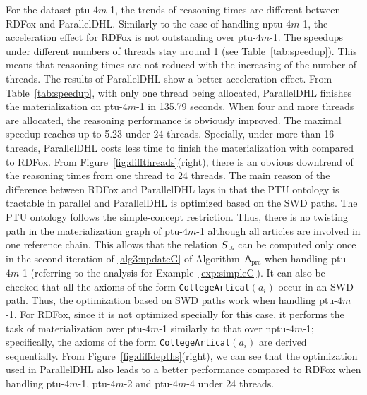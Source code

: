 For the dataset ptu-$4m$-1, the trends of reasoning times are different
between RDFox and ParallelDHL.
Similarly to the case of handling nptu-$4m$-1,
the acceleration effect for RDFox is not outstanding
over ptu-$4m$-1. The speedups under different numbers of threads stay around 1 (see Table~\ref{tab:speedup}).
This means that reasoning times are not reduced with the increasing of the number of threads.
The results of ParallelDHL show a better acceleration effect.
From Table~\ref{tab:speedup}, with only one thread being allocated, ParallelDHL finishes
the materialization on ptu-$4m$-1 in 135.79 seconds. When four and more threads
are allocated, the reasoning performance is obviously improved.
The maximal speedup reaches up to 5.23 under 24 threads.
Specially, under more than 16 threads, ParallelDHL
costs less time to finish the materialization with compared to RDFox.
From Figure~\ref{fig:diffthreads}(right), there is an obvious downtrend of the reasoning times
from one thread to 24 threads.
The main reason of the difference between RDFox and ParallelDHL
lays in that the PTU ontology is tractable in parallel and ParallelDHL
is optimized based on the SWD paths. The PTU ontology follows the
simple-concept restriction. Thus, there is no twisting path in
the materialization graph of ptu-$4m$-1 although all articles are involved
in one reference chain. This allows that the relation $S_{\textit{\!\tiny rch}}$ can be computed
only once in the second iteration of \ref{alg3:updateG} of Algorithm~$\mathsf{A}_{\text{prc}}$
when handling ptu-$4m$-1 (referring to the analysis for Example~\ref{exp:simpleC}).
It can also be checked that all the axioms of the form \texttt{CollegeArtical}$(a_i)$ occur in
an SWD path. Thus, the optimization based on SWD paths work when handling ptu-$4m$-1.
For RDFox, since it is not optimized specially for this case, it performs the task of
materialization over ptu-$4m$-1 similarly to that over nptu-$4m$-1;
specifically, the axioms of the form \texttt{CollegeArtical}$(a_i)$ are derived sequentially.
From Figure~\ref{fig:diffdepths}(right), we can see that the optimization used in ParallelDHL
also leads to a better performance compared to
RDFox when handling ptu-$4m$-1, ptu-$4m$-2 and ptu-$4m$-4 under 24 threads.

